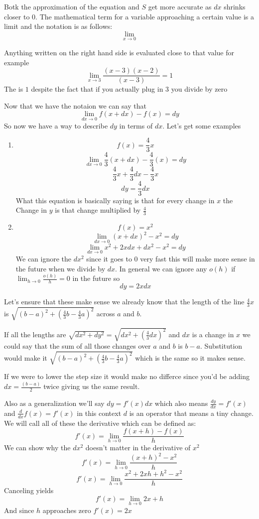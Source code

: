 \documentclass[12pt]{book}
\begin{document}
Botk the approximation of the equation and $S$ get more accurate as $dx$ shrinks closer to $0$. The mathematical term for a variable approaching a certain value is a limit and the notation is as follows:
\[
	\lim_{x \to 0}
\]


Anything written on the right hand side is evaluated close to that value for example
\[
\lim_{x \to 3} \frac{(x-3)(x-2)}{(x-3)} = 1
\]
The is $1$ despite the fact that if you actually plug in 3 you divide by zero

Now that we have the notaion we can say that
\[
\lim_{dx \to 0} {f(x+dx)-f(x)} = dy
\]
So now we have a way to describe $dy$ in terms of $dx$. Let's get some examples
\begin{enumerate}
	\item 
		$$f(x) = \frac{4}{3}x$$
		\[
		\lim_{dx \to 0} {\frac{4}{3}(x+dx)-\frac{4}{3}(x)} = dy
		\]
		$$\frac{4}{3}x + \frac{4}{3}dx - \frac{4}{3}x$$
		$$dy = \frac{4}{3}dx$$
		What this equation is basically saying is that for every change in $x$ the Change in $y$ is that change multiplied by $\frac{4}{3}$
	\item
		$$f(x) = x^2$$
		\[
		\lim_{dx \to 0} {(x+dx)^2-x^2} = dy
		\]
		\[
		\lim_{dx \to 0} {x^2+2xdx+dx^2-x^2} = dy
		\]
		We can ignore the $dx^2$ since it goes to 0 very fast this will make more sense in the future when we divide by $dx$. In general we can ignore any $o(h)$ if \( \displaystyle \lim_{h \to 0} \frac{o(h)}{h} = 0\) in the future so
		$$dy = 2xdx$$
\end{enumerate}

Let's ensure that these make sense we already know that the length of the line $\frac{4}{3}x$ is $\sqrt{(b-a)^2 + (\frac{4}{3}b - \frac{4}{3}a)^2}$ across $a$ and $b$. 

If all the lengths are $\sqrt{dx^2 + dy^2} = \sqrt{dx^2 + (\frac{4}{3}dx)^2}$ and $dx$ is a change in $x$ we could say that the sum of all those changes over $a$ and $b$ is $b-a$.
Substitution would make it $\sqrt{(b-a)^2 + (\frac{4}{3}b - \frac{4}{3}a)^2}$ which is the same so it makes sense.

If we were to lower the step size it would make no differce since you'd be adding $dx = \frac{(b-a)}{2}$ twice giving us the same result.
%    
%    
%    

Also as a generalization we'll say $dy = f'(x)dx$ which also means $\frac{dy}{dx}=f'(x)$ and $\frac{d}{dx}f(x)=f'(x)$ in this context $d$ is an operator that means a tiny change. We will call all of these the derivative which can be defined as:
\[
f'(x) = \lim_{h \to 0} \frac{f(x + h) - f(x)}{h}
\]
We can show why the $dx^2$ doesn't matter in the derivative of $x^2$
\[
	f'(x) = \lim_{h \to 0} \frac{(x+h)^2 - x^2}{h}
\]
\[
	f'(x) = \lim_{h \to 0} \frac{x^2 + 2xh + h^2 - x^2}{h}
\]
Canceling yields
\[
	f'(x) = \lim_{h \to 0} 2x + h
\]
And since $h$ approaches zero $f'(x) = 2x$
\end{document}
